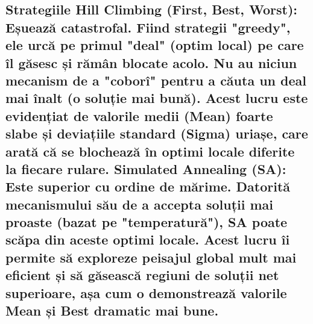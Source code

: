 \documentclass[
]{article}
\begin{document}
{\subsection{\texorpdfstring{\textbf{Strategiile Hill Climbing (First,
Best, Worst):} Eșuează catastrofal. Fiind strategii "greedy", ele urcă
pe primul "deal" (optim local) pe care îl găsesc și rămân blocate acolo.
Nu au niciun mecanism de a "coborî" pentru a căuta un deal mai înalt (o
soluție mai bună). Acest lucru este evidențiat de valorile medii (Mean)
foarte slabe și deviațiile standard (Sigma) uriașe, care arată că se
blochează în optimi locale diferite la fiecare rulare. \textbf{Simulated
Annealing (SA):} Este superior cu ordine de mărime. Datorită
mecanismului său de a accepta soluții mai proaste (bazat pe
"temperatură"), SA poate scăpa din aceste optimi locale. Acest lucru îi
permite să exploreze peisajul global mult mai eficient și să găsească
regiuni de soluții net superioare, așa cum o demonstrează valorile Mean
și Best dramatic mai bune.\\
}{Strategiile Hill Climbing (First, Best, Worst): Eșuează catastrofal. Fiind strategii "greedy", ele urcă pe primul "deal" (optim local) pe care îl găsesc și rămân blocate acolo. Nu au niciun mecanism de a "coborî" pentru a căuta un deal mai înalt (o soluție mai bună). Acest lucru este evidențiat de valorile medii (Mean) foarte slabe și deviațiile standard (Sigma) uriașe, care arată că se blochează în optimi locale diferite la fiecare rulare. Simulated Annealing (SA): Este superior cu ordine de mărime. Datorită mecanismului său de a accepta soluții mai proaste (bazat pe "temperatură"), SA poate scăpa din aceste optimi locale. Acest lucru îi permite să exploreze peisajul global mult mai eficient și să găsească regiuni de soluții net superioare, așa cum o demonstrează valorile Mean și Best dramatic mai bune. }}\label{strategiile-hill-climbing-first-best-worst-eux219ueazux103-catastrofal.-fiind-strategii-greedy-ele-urcux103-pe-primul-deal-optim-local-pe-care-uxeel-gux103sesc-ux219i-rux103muxe2n-blocate-acolo.-nu-au-niciun-mecanism-de-a-coboruxee-pentru-a-cux103uta-un-deal-mai-uxeenalt-o-soluux21bie-mai-bunux103.-acest-lucru-este-evidenux21biat-de-valorile-medii-mean-foarte-slabe-ux219i-deviaux21biile-standard-sigma-uriaux219e-care-aratux103-cux103-se-blocheazux103-uxeen-optimi-locale-diferite-la-fiecare-rulare.-simulated-annealing-sa-este-superior-cu-ordine-de-mux103rime.-datoritux103-mecanismului-sux103u-de-a-accepta-soluux21bii-mai-proaste-bazat-pe-temperaturux103-sa-poate-scux103pa-din-aceste-optimi-locale.-acest-lucru-uxeei-permite-sux103-exploreze-peisajul-global-mult-mai-eficient-ux219i-sux103-gux103seascux103-regiuni-de-soluux21bii-net-superioare-aux219a-cum-o-demonstreazux103-valorile-mean-ux219i-best-dramatic-mai-bune.}}
\end{document}
